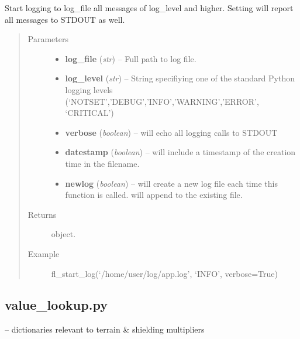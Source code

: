 \documentclass[letterpaper,10pt,english]{sphinxmanual}
\begin{document}

\begin{fulllineitems}
\label{docs/utilities:utilities.files.fl_start_log}
Start logging to log\_file all messages of log\_level and higher.
Setting  will report all messages to STDOUT as well.
\begin{quote}\begin{description}
\item[{Parameters}] \leavevmode\begin{itemize}
\item {} 
\textbf{log\_file} (\emph{str}) -- Full path to log file.

\item {} 
\textbf{log\_level} (\emph{str}) -- String specifiying one of the standard Python logging
levels (`NOTSET','DEBUG','INFO','WARNING','ERROR',
`CRITICAL')

\item {} 
\textbf{verbose} (\emph{boolean}) --  will echo all logging calls to STDOUT

\item {} 
\textbf{datestamp} (\emph{boolean}) --  will include a timestamp of the creation
time in the filename.

\item {} 
\textbf{newlog} (\emph{boolean}) --  will create a new log file each time this
function is called.  will append to the
existing file.

\end{itemize}

\item[{Returns}] \leavevmode
{} object.

\item[{Example }] \leavevmode
fl\_start\_log(`/home/user/log/app.log', `INFO', verbose=True)

\end{description}\end{quote}

\end{fulllineitems}



\subsection{value\_lookup.py}
\label{docs/utilities:value-lookup-py}\label{docs/utilities:module-value_lookup}
{\hyperref[docs/utilities:module-value_lookup]{}} -- dictionaries relevant to terrain \& shielding multipliers
\end{document}
